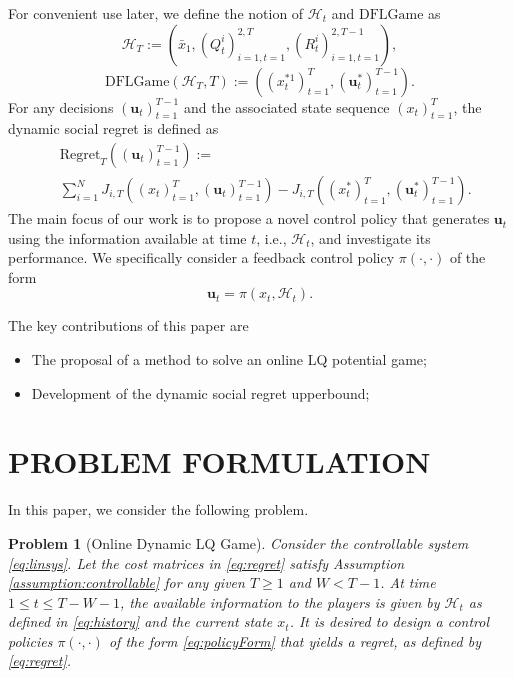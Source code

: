 \documentclass{article}
\newtheorem{problem}{Problem}
\begin{document}
For convenient use later, we define the notion of $\mathcal{H}_{t}$ and $\text{DFLGame}$ as
\begin{equation}\label{eq:history}
    \mathcal{H}_{T} := ( \bar{x}_{1},(Q_{t}^{i})_{i=1,t=1}^{2,T},(R_{t}^{i})_{i=1,t=1}^{2,T-1}),
\end{equation}
\begin{equation}\label{eq:regret}
 \text{DFLGame}(\mathcal{H}_{T},T):=((x_{t}^{*1})_{t=1}^{T}, (\mathbf{u}_{t}^{*})_{t=1}^{T-1}).
\end{equation}
For any decisions $(\mathbf{u}_{t})_{t=1}^{T-1}$ and the associated state sequence $(x_{t})_{t=1}^{T}$, the dynamic social regret is defined as
\begin{equation}
    \begin{split}
        &\text{Regret}_{T}((\mathbf{u}_{t})_{t=1}^{T-1}) := \\
        &\sum_{i=1}^{N} J_{i,T}((x_{t})_{t=1}^{T},(\mathbf{u}_{t})_{t=1}^{T-1}) - J_{i,T}((x_{t}^{*})_{t=1}^{T},(\mathbf{u}_{t}^{*})_{t=1}^{T-1}).
    \end{split}
\end{equation}
The main focus of our work is to propose a novel control policy that generates $\mathbf{u}_{t}$ using the information available at time $t$, i.e., $\mathcal{H}_{t}$, and investigate its performance. We specifically consider a feedback control policy $\pi(\cdot,\cdot)$ of the form 
\begin{equation}\label{eq:policyForm}
    \mathbf{u}_{t} = \pi(x_{t}, \mathcal{H}_{t}).
\end{equation}

The key contributions of this paper are
\begin{itemize}
    \item The proposal of a method to solve an online LQ potential game;
    \item Development of the dynamic social regret upperbound;
\end{itemize}


\section{PROBLEM FORMULATION}


In this paper, we consider the following problem.
\begin{problem}[Online Dynamic LQ Game]
     Consider the controllable system \eqref{eq:linsys}. Let the cost matrices in \eqref{eq:regret} satisfy Assumption \ref{assumption:controllable} for any given $T \geq 1$ and $W < T-1$. At time $1 \leq t \leq T-W-1$, the available information to the players is given by $\mathcal{H}_{t}$ as defined in \eqref{eq:history} and the current state $x_{t}$. It is desired to design a control policies $\pi(\cdot, \cdot)$ of the form \eqref{eq:policyForm} that yields a regret, as defined by \eqref{eq:regret}.
\end{problem}
\end{document}
